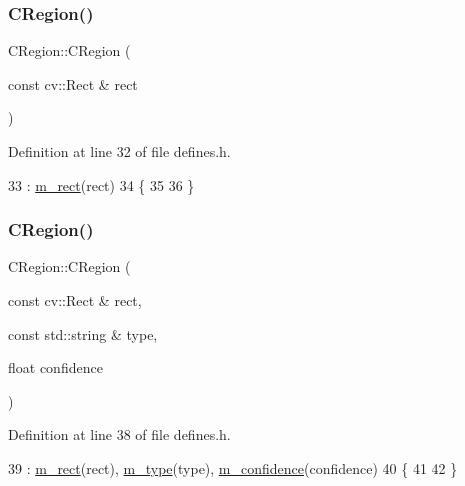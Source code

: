 \subsubsection{\texorpdfstring{C\+Region()}{CRegion()}\hspace{0.1cm}{\footnotesize\ttfamily [2/3]}}
{\footnotesize\ttfamily C\+Region\+::\+C\+Region (\begin{DoxyParamCaption}\item[{const cv\+::\+Rect \&}]{rect }\end{DoxyParamCaption})\hspace{0.3cm}{\ttfamily [inline]}}



Definition at line 32 of file defines.\+h.


\begin{DoxyCode}
33         : \mbox{\hyperlink{class_c_region_a6f68304e90428db829cc38792fa3e1e8}{m\_rect}}(rect)
34     \{
35 
36     \}
\end{DoxyCode}
\mbox{\label{class_c_region_aa946953a5829934b7c235adf7e8a8517}} 
\subsubsection{\texorpdfstring{C\+Region()}{CRegion()}\hspace{0.1cm}{\footnotesize\ttfamily [3/3]}}
{\footnotesize\ttfamily C\+Region\+::\+C\+Region (\begin{DoxyParamCaption}\item[{const cv\+::\+Rect \&}]{rect,  }\item[{const std\+::string \&}]{type,  }\item[{float}]{confidence }\end{DoxyParamCaption})\hspace{0.3cm}{\ttfamily [inline]}}



Definition at line 38 of file defines.\+h.


\begin{DoxyCode}
39         : \mbox{\hyperlink{class_c_region_a6f68304e90428db829cc38792fa3e1e8}{m\_rect}}(rect), \mbox{\hyperlink{class_c_region_a287bf43ffa4837595762cbb007459a9a}{m\_type}}(type), \mbox{\hyperlink{class_c_region_a349d846f135edc49a4c8f2db994b84b8}{m\_confidence}}(confidence)
40     \{
41 
42     \}
\end{DoxyCode}


